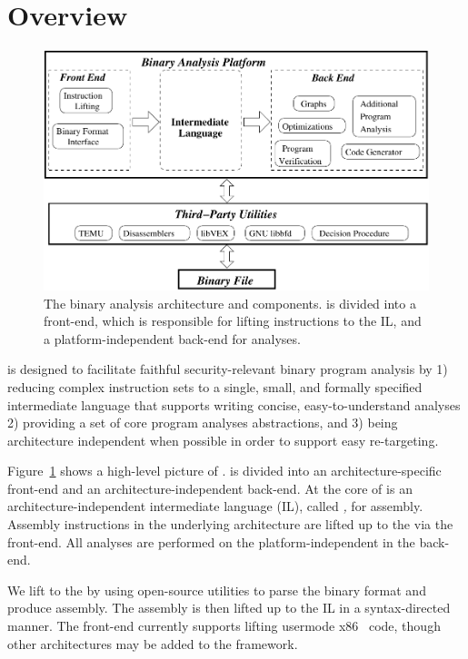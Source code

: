 \section{\bap Overview}

\begin{figure}
\centering
\includegraphics[scale=.8]{fig/components}
\caption{The \bap binary analysis architecture and components. \bap
  is divided into a front-end, which is responsible for lifting
  instructions to the \bap IL, and a platform-independent back-end
  for analyses.}
\label{fig:vine-components}
\end{figure}

\bap  is designed to facilitate faithful
security-relevant binary program analysis by 1) reducing complex
instruction sets to a single, small, and formally specified
intermediate language that supports writing  concise,
easy-to-understand analyses 2) providing a set of core program analyses
abstractions, and 3) being architecture independent when possible in
order to support easy re-targeting.


Figure~\ref{fig:vine-components} shows a high-level picture of \bap.
\bap is divided into an architecture-specific front-end and an
architecture-independent back-end.  At the core of \bap is an
architecture-independent intermediate language (IL), called \emph{\bil,} for
assembly. Assembly instructions in the underlying architecture are
lifted up to the \bil via the \bap front-end.  All analyses are
performed on the platform-independent \bil in the back-end.

We lift to the \bil by using open-source utilities to parse the binary
format and produce assembly.  The assembly is then lifted up to the
\bap IL in a syntax-directed manner. The \bap front-end currently
supports lifting usermode x86~\cite{intel:x86} code, though other
architectures may be added to the \bap framework.

